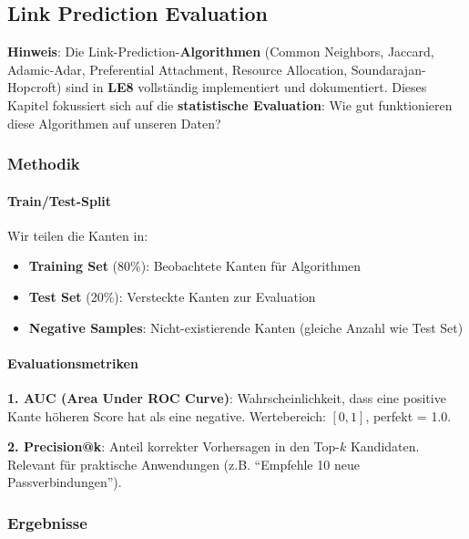 \subsection{Link Prediction Evaluation}

\textbf{Hinweis}: Die Link-Prediction-\textbf{Algorithmen} (Common Neighbors, Jaccard, Adamic-Adar, Preferential Attachment, Resource Allocation, Soundarajan-Hopcroft) sind in \textbf{LE8} vollständig implementiert und dokumentiert. Dieses Kapitel fokussiert sich auf die \textbf{statistische Evaluation}: Wie gut funktionieren diese Algorithmen auf unseren Daten?

\subsubsection{Methodik}

\paragraph{Train/Test-Split}
Wir teilen die Kanten in:
\begin{itemize}
  \item \textbf{Training Set} (80\%): Beobachtete Kanten für Algorithmen
  \item \textbf{Test Set} (20\%): Versteckte Kanten zur Evaluation
  \item \textbf{Negative Samples}: Nicht-existierende Kanten (gleiche Anzahl wie Test Set)
\end{itemize}

\paragraph{Evaluationsmetriken}

\textbf{1. AUC (Area Under ROC Curve)}: Wahrscheinlichkeit, dass eine positive Kante höheren Score hat als eine negative. Wertebereich: $[0, 1]$, perfekt = 1.0.

\textbf{2. Precision@k}: Anteil korrekter Vorhersagen in den Top-$k$ Kandidaten. Relevant für praktische Anwendungen (z.B. ``Empfehle 10 neue Passverbindungen'').

\subsubsection{Ergebnisse}

